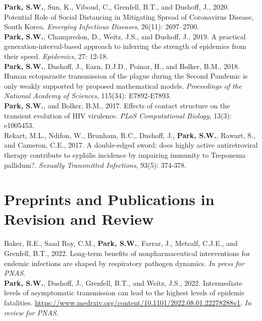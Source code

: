 \documentclass[11pt]{article} %
\begin{document}
 \textbf{Park, S.W.}, Sun, K., Viboud, C., Grenfell, B.T., and Dushoff, J., 2020. Potential Role of Social Distancing in Mitigating Spread of Coronavirus Disease, South Korea. \textit{Emerging Infectious Diseases}, 26(11): 2697–2700.\\

 \textbf{Park, S.W.}, Champredon, D., Weitz, J.S., and Dushoff, J., 2019. A practical generation-interval-based approach to inferring the strength of epidemics from their speed. \textit{Epidemics}, 27: 12-18.\\

 \textbf{Park, S.W.}, Dushoff, J., Earn, D.J.D., Poinar, H., and Bolker, B.M., 2018. Human
ectoparasite transmission of the plague during the Second Pandemic is only weakly
supported by proposed mathematical models. \textit{Proceedings of the National Academy of Sciences}, 115(34): E7892-E7893.\\

 \textbf{Park, S.W.}, and Bolker, B.M., 2017. Effects of contact structure on the transient
evolution of HIV virulence. \textit{PLoS Computational Biology}, 13(3): e1005453.\\

 Rekart, M.L., Ndifon, W., Brunham, R.C., Dushoff, J., \textbf{Park, S.W.}, Rawart, S., and
Cameron, C.E., 2017. A double-edged sword: does highly active antiretroviral therapy contribute to syphilis incidence by impairing immunity to Treponema pallidum?.
\textit{Sexually Transmitted Infections}, 93(5): 374-378.\\

\section*{Preprints and Publications in Revision and Review}

 Baker, R.E., Saad Roy, C.M., \textbf{Park, S.W.}, Farrar, J., Metcalf, C.J.E., and Grenfell, B.T., 2022. Long-term benefits of nonpharmaceutical interventions for endemic infections are shaped by respiratory pathogen dynamics. \textit{In press for PNAS}.\\

 \textbf{Park, S.W.}, Dushoff, J., Grenfell, B.T., and Weitz, J.S., 2022. Intermediate levels of asymptomatic transmission can lead to the highest levels of epidemic fatalities. \url{https://www.medrxiv.org/content/10.1101/2022.08.01.22278288v1}. \textit{In review for PNAS}.\\
\end{document}
